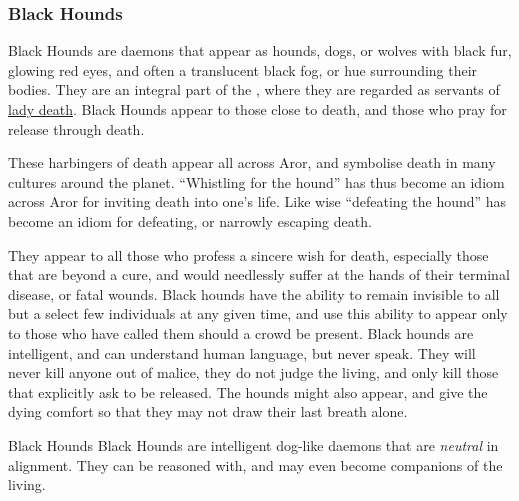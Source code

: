 \subsubsection{Black Hounds}
\label{sec:Black Hounds}

Black Hounds are daemons that appear as hounds, dogs, or wolves with black
fur, glowing red eyes, and often a translucent black fog, or hue surrounding
their bodies. They are an integral part of the , where
they are regarded as servants of \hyperref[sec:Morana]{lady death}. Black
Hounds appear to those close to death, and those who pray for release through
death.

These harbingers of death appear all across Aror, and symbolise death in many
cultures around the planet. ``Whistling for the hound'' has thus become an
idiom across Aror for inviting death into one's life. Like wise ``defeating
the hound'' has become an idiom for defeating, or narrowly escaping death.

They appear to all those who profess a sincere wish for death, especially
those that are beyond a cure, and would needlessly suffer at the hands of
their terminal disease, or fatal wounds. Black hounds have the ability to
remain invisible to all but a select few individuals at any given time, and
use this ability to appear only to those who have called them should a crowd
be present. Black hounds are intelligent, and can understand human language,
but never speak. They will never kill anyone out of malice, they do not judge
the living, and only kill those that explicitly ask to be released. The hounds
might also appear, and give the dying comfort so that they may not draw their
last breath alone.

\begin{35e}{Black Hounds}
  Black Hounds are intelligent dog-like daemons that are \emph{neutral} in
  alignment. They can be reasoned with, and may even become companions of
  the living.
\end{35e}
